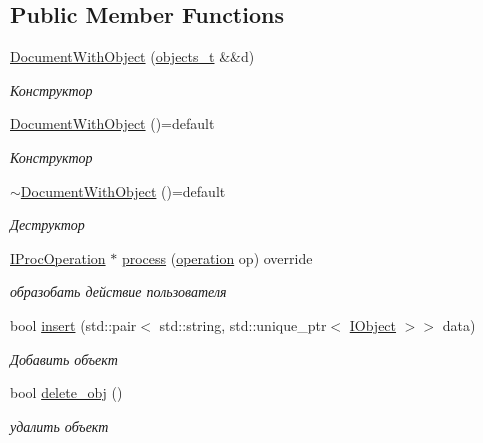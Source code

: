 \subsection*{Public Member Functions}
\begin{DoxyCompactItemize}
\item 
\hyperlink{class_document_with_object_aa084d636c7cc75deca1df00a3a0edbe9}{Document\+With\+Object} (\hyperlink{class_document_with_object_a955b8e449e2c7a393594163f3a122770}{objects\+\_\+t} \&\&d)
\begin{DoxyCompactList}\small\item\em Конструктор \end{DoxyCompactList}\item 
\hyperlink{class_document_with_object_a55bdb2e586b8afdaa86d6770a4829aa1}{Document\+With\+Object} ()=default
\begin{DoxyCompactList}\small\item\em Конструктор \end{DoxyCompactList}\item 
\hyperlink{class_document_with_object_a8dd13839e413d14652e6a83dee68e0b4}{$\sim$\+Document\+With\+Object} ()=default
\begin{DoxyCompactList}\small\item\em Деструктор \end{DoxyCompactList}\item 
\hyperlink{struct_i_proc_operation}{I\+Proc\+Operation} $\ast$ \hyperlink{class_document_with_object_a97b7ac150c854626ceb8cc4af4c0766e}{process} (\hyperlink{main_8cpp_ad34e7fb3c33543e9f3a1e48486fa7692}{operation} op) override
\begin{DoxyCompactList}\small\item\em образобать действие пользователя \end{DoxyCompactList}\item 
bool \hyperlink{class_document_with_object_a1c7dddf954158f79c4ebb061a8228502}{insert} (std\+::pair$<$ std\+::string, std\+::unique\+\_\+ptr$<$ \hyperlink{struct_i_object}{I\+Object} $>$$>$ data)
\begin{DoxyCompactList}\small\item\em Добавить объект \end{DoxyCompactList}\item 
bool \hyperlink{class_document_with_object_acb2f51e9731ef351e1fe7b5f5098ff43}{delete\+\_\+obj} ()
\begin{DoxyCompactList}\small\item\em удалить объект \end{DoxyCompactList}\end{DoxyCompactItemize}



